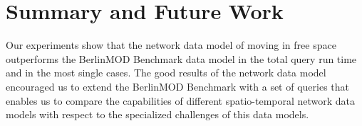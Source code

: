 \documentclass[a4paper]{article}
\newcommand{\bmodb} {BerlinMOD Benchmark}
\begin{document}
\section{Summary and Future Work}
\label{sec:summary}
Our experiments show that the network data model of moving in free space
 outperforms the \bmodb{} data model in the total query run time and in the most
single cases. The good results of the network data model encouraged us to extend
the \bmodb{} with a set of queries that enables us to compare the capabilities of
 different spatio-temporal network data models with respect to the specialized
 challenges of this data models.

{}

\end{document}
